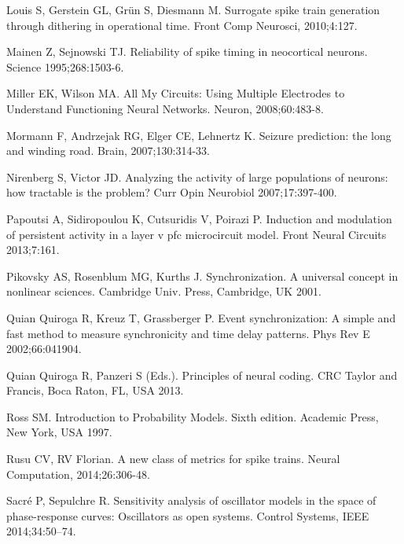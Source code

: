 \documentclass[10pt,twocolumn]{elsart5p}
\begin{document}
\begin{thebibliography}{25}
Louis S, Gerstein GL, Gr{\"u}n S, Diesmann M. Surrogate spike train generation through dithering in operational time. Front Comp Neurosci, 2010;4:127.

Mainen Z, Sejnowski TJ. Reliability of spike timing in neocortical neurons. Science 1995;268:1503-6.

Miller EK, Wilson MA. All My Circuits: Using Multiple Electrodes to Understand Functioning Neural Networks. Neuron, 2008;60:483-8.

Mormann F, Andrzejak RG, Elger CE, Lehnertz K. Seizure prediction: the long and winding road. Brain, 2007;130:314-33.

Nirenberg S, Victor JD. Analyzing the activity of large populations of neurons: how tractable is the problem? Curr Opin Neurobiol 2007;17:397-400.

Papoutsi A, Sidiropoulou K, Cutsuridis V, Poirazi P. Induction and modulation of persistent activity in a layer v pfc microcircuit model. Front Neural Circuits 2013;7:161.

Pikovsky AS, Rosenblum MG, Kurths J. Synchronization. A universal concept in nonlinear sciences. Cambridge Univ. Press, Cambridge, UK 2001.

{Quian Quiroga} R, Kreuz T, Grassberger P. Event synchronization: \textsc{A} simple and fast method to measure synchronicity and time delay patterns. Phys Rev E 2002;66:041904.

{Quian Quiroga} R, Panzeri S (Eds.). Principles of neural coding. CRC Taylor and Francis, Boca Raton, FL, USA 2013.

Ross SM. Introduction to Probability Models. Sixth edition. Academic Press, New York, USA 1997.

Rusu CV, RV Florian. A new class of metrics for spike trains. Neural Computation, 2014;26:306-48.

Sacr\'{e} P, Sepulchre R. Sensitivity analysis of oscillator models in the space of phase-response curves: Oscillators as open systems. Control Systems, IEEE 2014;34:50–74.


\end{thebibliography}
\end{document}
